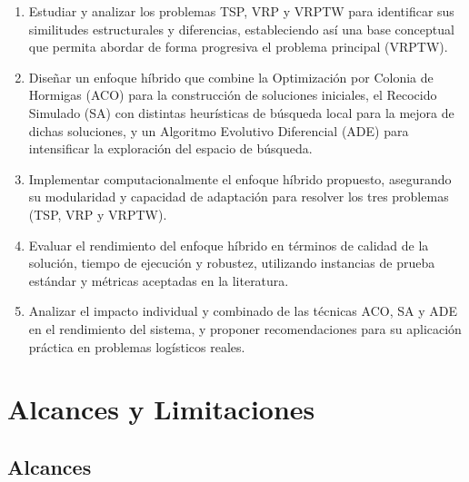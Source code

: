 \documentclass[12pt,titlepage,twoside,openright]{book}
\begin{document}
\begin{enumerate}
    \item Estudiar y analizar los problemas TSP, VRP y VRPTW para identificar sus similitudes estructurales y diferencias, estableciendo así una base conceptual que permita abordar de forma progresiva el problema principal (VRPTW).
    
    \item Diseñar un enfoque híbrido que combine la Optimización por Colonia de Hormigas (ACO) para la construcción de soluciones iniciales, el Recocido Simulado (SA) con distintas heurísticas de búsqueda local para la mejora de dichas soluciones, y un Algoritmo Evolutivo Diferencial (ADE) para intensificar la exploración del espacio de búsqueda.
    
    \item Implementar computacionalmente el enfoque híbrido propuesto, asegurando su modularidad y capacidad de adaptación para resolver los tres problemas (TSP, VRP y VRPTW).
    
    \item Evaluar el rendimiento del enfoque híbrido en términos de calidad de la solución, tiempo de ejecución y robustez, utilizando instancias de prueba estándar y métricas aceptadas en la literatura.
    
    \item Analizar el impacto individual y combinado de las técnicas ACO, SA y ADE en el rendimiento del sistema, y proponer recomendaciones para su aplicación práctica en problemas logísticos reales.
\end{enumerate}


\section{Alcances y Limitaciones}

\subsection*{Alcances}
\end{document}
